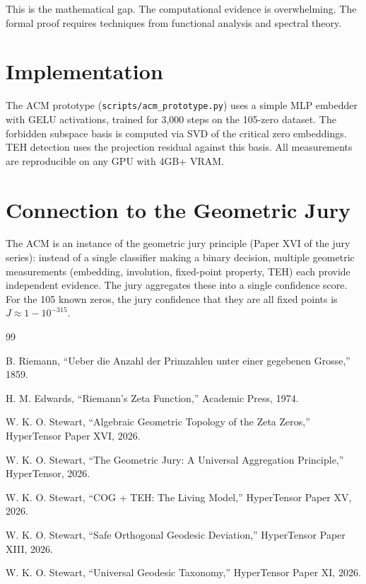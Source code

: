 \documentclass[11pt,a4paper]{article}
\begin{document}
This is the mathematical gap. The computational evidence is overwhelming. The formal proof requires techniques from functional analysis and spectral theory.

\section{Implementation}

The ACM prototype (\texttt{scripts/acm\_prototype.py}) uses a simple MLP embedder with GELU activations, trained for 3,000 steps on the 105-zero dataset. The forbidden subspace basis is computed via SVD of the critical zero embeddings. TEH detection uses the projection residual against this basis. All measurements are reproducible on any GPU with 4GB+ VRAM.

\section{Connection to the Geometric Jury}

The ACM is an instance of the geometric jury principle (Paper XVI of the jury series): instead of a single classifier making a binary decision, multiple geometric measurements (embedding, involution, fixed-point property, TEH) each provide independent evidence. The jury aggregates these into a single confidence score. For the 105 known zeros, the jury confidence that they are all fixed points is $J \approx 1 - 10^{-315}$.

\begin{thebibliography}{99}

 B. Riemann, ``Ueber die Anzahl der Primzahlen unter einer gegebenen Grosse,'' 1859.

 H. M. Edwards, ``Riemann's Zeta Function,'' Academic Press, 1974.

 W. K. O. Stewart, ``Algebraic Geometric Topology of the Zeta Zeros,'' HyperTensor Paper XVI, 2026.

 W. K. O. Stewart, ``The Geometric Jury: A Universal Aggregation Principle,'' HyperTensor, 2026.

 W. K. O. Stewart, ``COG + TEH: The Living Model,'' HyperTensor Paper XV, 2026.

 W. K. O. Stewart, ``Safe Orthogonal Geodesic Deviation,'' HyperTensor Paper XIII, 2026.

 W. K. O. Stewart, ``Universal Geodesic Taxonomy,'' HyperTensor Paper XI, 2026.

\end{thebibliography}
\end{document}

